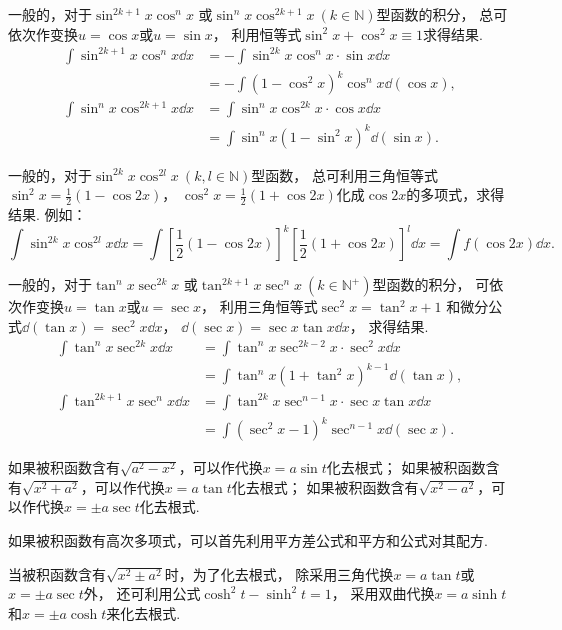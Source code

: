 一般的，对于\(\sin^{2k+1} x \cos^n x\)
或\(\sin^n x \cos^{2k+1} x\ (k \in \mathbb{N})\)型函数的积分，
总可依次作变换\(u=\cos x\)或\(u=\sin x\)，
利用恒等式\(\sin^2 x + \cos^2 x \equiv 1\)求得结果.
\begin{align*}
	\int \sin^{2k+1} x \cos^n x \dd{x}
	&= - \int \sin^{2k} x \cos^n x \cdot \sin x \dd{x} \\
	&= - \int (1-\cos^2 x)^k \cos^n x \dd(\cos x), \\
	\int \sin^n x \cos^{2k+1} x \dd{x}
	&= \int \sin^n x \cos^{2k} x \cdot \cos x \dd{x} \\
	&= \int \sin^n x (1-\sin^2 x)^k \dd(\sin x).
\end{align*}

一般的，对于\(\sin^{2k} x \cos^{2l} x\ (k,l \in \mathbb{N})\)型函数，
总可利用三角恒等式\(\sin^2 x = \frac{1}{2}(1-\cos 2x)\)，
\(\cos^2 x = \frac{1}{2}(1+\cos 2x)\)化成\(\cos 2x\)的多项式，求得结果.
例如：\[
	\int \sin^{2k} x \cos^{2l} x \dd{x}
	= \int \left[\frac{1}{2}(1-\cos 2x)\right]^k
		\left[\frac{1}{2}(1+\cos 2x)\right]^l \dd{x}
	= \int f(\cos 2x) \dd{x}.
\]

一般的，对于\(\tan^n x \sec^{2k} x\)
或\(\tan^{2k+1} x \sec^n x\ (k \in \mathbb{N}^+)\)型函数的积分，
可依次作变换\(u=\tan x\)或\(u=\sec x\)，
利用三角恒等式\(\sec^2 x = \tan^2 x + 1\)
和微分公式\(\dd(\tan x) = \sec^2 x \dd{x}\)，
\(\dd(\sec x) = \sec x \tan x \dd{x}\)，
求得结果.
\begin{align*}
	\int \tan^n x \sec^{2k} x \dd{x}
	&=\int \tan^n x\sec^{2k-2} x \cdot \sec^2 x \dd{x} \\
	&=\int \tan^n x(1+\tan^2 x)^{k-1} \dd(\tan x), \\
	\int \tan^{2k+1} x \sec^n x \dd{x}
	&=\int \tan^{2k} x \sec^{n-1} x \cdot \sec x\tan x\dd{x} \\
	&=\int (\sec^2 x - 1)^k \sec^{n-1} x \dd(\sec x).
\end{align*}

如果被积函数含有\(\sqrt{a^2 - x^2}\)，可以作代换\(x = a \sin t\)化去根式；
如果被积函数含有\(\sqrt{x^2 + a^2}\)，可以作代换\(x=a \tan t\)化去根式；
如果被积函数含有\(\sqrt{x^2 - a^2}\)，可以作代换\(x=\pm a \sec t\)化去根式.

如果被积函数有高次多项式，可以首先利用平方差公式和平方和公式对其配方.

当被积函数含有\(\sqrt{x^2 \pm a^2}\)时，为了化去根式，
除采用三角代换\(x = a \tan t\)或\(x = \pm a \sec t\)外，
还可利用公式\(\cosh^2 t - \sinh^2 t = 1\)，
采用双曲代换\(x = a \sinh t\)和\(x = \pm a \cosh t\)来化去根式.

